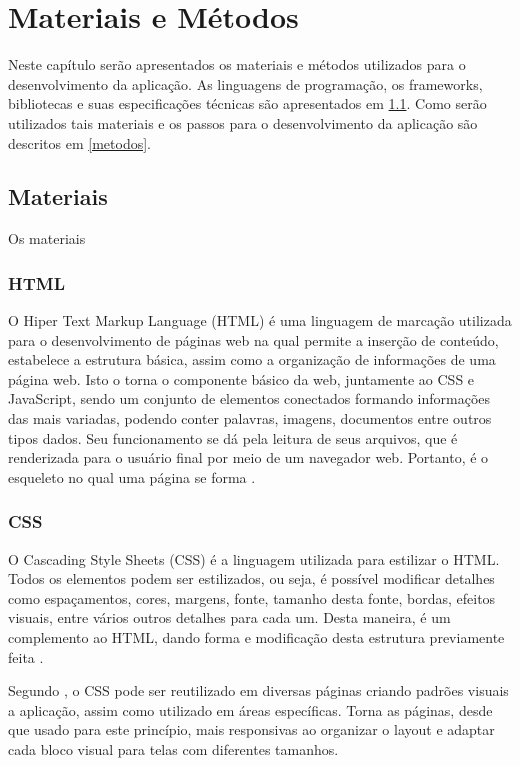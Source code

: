 \chapter{Materiais e Métodos}\label{chp:LABEL_CHP_3}
Neste capítulo serão apresentados os materiais e métodos utilizados para o desenvolvimento da aplicação. As linguagens de programação, os frameworks, bibliotecas e suas especificações técnicas são apresentados em \ref{materiais}. Como serão utilizados tais materiais e os passos para o desenvolvimento da aplicação são descritos em \ref{metodos}.

\section{Materiais} \label{materiais}
Os materiais

\subsection{HTML}
O Hiper Text Markup Language (HTML) é uma linguagem de marcação utilizada para o desenvolvimento de páginas web na qual permite a inserção de conteúdo, estabelece a estrutura básica, assim como a organização de informações de uma página web. Isto o torna o componente básico da web, juntamente ao CSS e JavaScript, sendo um conjunto de elementos conectados formando informações das mais variadas, podendo conter palavras, imagens, documentos entre outros tipos dados. Seu funcionamento se dá pela leitura de seus arquivos, que é renderizada para o usuário final por meio de um navegador web. Portanto, é o esqueleto no qual uma página se forma \cite{FLANAGAN}.

\subsection{CSS}
O Cascading Style Sheets (CSS) é a linguagem utilizada para estilizar o HTML. Todos os elementos podem ser estilizados, ou seja, é possível modificar detalhes como espaçamentos, cores, margens, fonte, tamanho desta fonte, bordas, efeitos visuais, entre vários outros detalhes para cada um. Desta maneira, é um complemento ao HTML, dando forma e modificação desta estrutura previamente feita \cite{FLANAGAN}.

Segundo , o CSS pode ser reutilizado em diversas páginas criando padrões visuais a aplicação, assim como utilizado em áreas específicas. Torna as páginas, desde que usado para este princípio, mais responsivas ao organizar o layout e adaptar cada bloco visual para telas com diferentes tamanhos.


